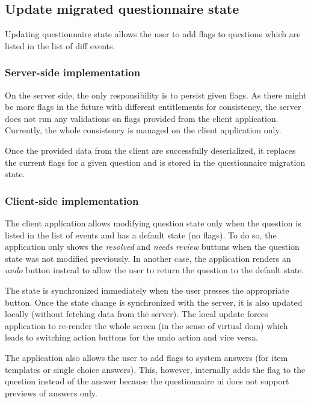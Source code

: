 
\subsection{Update migrated questionnaire state}

Updating questionnaire state allows the user to add flags to questions which are listed in the list of diff events.

\subsubsection*{Server-side implementation}

On the server side, the only responsibility is to persist given flags.
As there might be more flags in the future with different entitlements for consistency, the server does not run any validations on flags provided from the client application.
Currently, the whole consistency is managed on the client application only.

Once the provided data from the client are successfully deserialized, it replaces the current flags for a given question and is stored in the questionnaire migration state.

\subsubsection*{Client-side implementation}

The client application allows modifying question state only when the question is listed in the list of events and has a default state (no flags).
To do so, the application only shows the \textit{resolved} and \textit{needs review} buttons when the question state was not modified previously.
In another case, the application renders an \textit{undo} button instead to allow the user to return the question to the default state.

The state is synchronized immediately when the user presses the appropriate button.
Once the state change is synchronized with the server, it is also updated locally (without fetching data from the server).
The local update forces application to re-render the whole screen (in the sense of virtual \gls{dom}) which leads to switching action buttons for the undo action and vice versa.

The application also allows the user to add flags to system answers (for item templates or single choice answers).
This, however, internally adds the flag to the question instead of the answer because the questionnaire \gls{ui} does not support previews of answers only.

